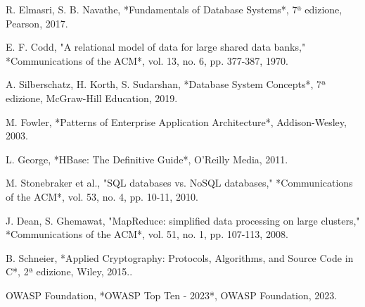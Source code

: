 \clearpage{\pagestyle{empty}\cleardoublepage}



\begin{thebibliography}{99}

R. Elmasri, S. B. Navathe, *Fundamentals of Database Systems*, 7ª edizione, Pearson, 2017.

 E. F. Codd, "A relational model of data for large shared data banks," *Communications of the ACM*, vol. 13, no. 6, pp. 377-387, 1970.

A. Silberschatz, H. Korth, S. Sudarshan, *Database System Concepts*, 7ª edizione, McGraw-Hill Education, 2019.

M. Fowler, *Patterns of Enterprise Application Architecture*, Addison-Wesley, 2003.

L. George, *HBase: The Definitive Guide*, O'Reilly Media, 2011.

M. Stonebraker et al., "SQL databases vs. NoSQL databases," *Communications of the ACM*, vol. 53, no. 4, pp. 10-11, 2010.

J. Dean, S. Ghemawat, "MapReduce: simplified data processing on large clusters," *Communications of the ACM*, vol. 51, no. 1, pp. 107-113, 2008.

B. Schneier, *Applied Cryptography: Protocols, Algorithms, and Source Code in C*, 2ª edizione, Wiley, 2015..

OWASP Foundation, *OWASP Top Ten - 2023*, OWASP Foundation, 2023.

\end{thebibliography}









